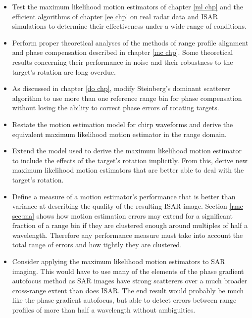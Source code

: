 \begin{itemize}
\item Test the maximum likelihood motion estimators of chapter \ref{ml chp}
and the efficient algorithms of chapter \ref{ee chp} on real radar data and
ISAR simulations to determine their effectiveness under a wide range of
conditions.

\item Perform proper theoretical analyses of the methods of range profile
alignment and phase compensation described in chapter \ref{mc chp}.  Some
theoretical results concerning their performance in noise and their
robustness to the target's rotation are long overdue.

\item As discussed in chapter \ref{do chp}, modify Steinberg's dominant scatterer
algorithm to use more than one reference range bin for phase compensation
without losing the ability to correct phase errors of rotating targets.

\item Restate the motion estimation model for chirp waveforms and derive 
the equivalent maximum likelihood motion estimator in the range domain.

\item Extend the model used to derive the maximum likelihood motion
estimator to include the effects of the target's rotation implicitly.  From
this, derive new maximum likelihood motion estimators that are better able
to deal with the target's rotation.

\item Define a measure of a motion estimator's performance that is better
than variance at describing the quality of the resulting ISAR image. 
Section \ref{rmc sec:ma} shows how motion estimation errors may extend for a
significant fraction of a range bin if they are clustered enough around
multiples of half a wavelength.  Therefore any performance measure must take into
account the total range of errors and how tightly they are clustered.

\item Consider applying the maximum likelihood motion estimators to SAR
imaging.  This would have to use many of the elements of the phase
gradient autofocus method as SAR images have strong scatterers over a much
broader cross-range extent than does ISAR.  The end result would probably
be much like the phase gradient autofocus, but able to detect errors 
between range profiles of more than half a wavelength without ambiguities.


\end{itemize}
